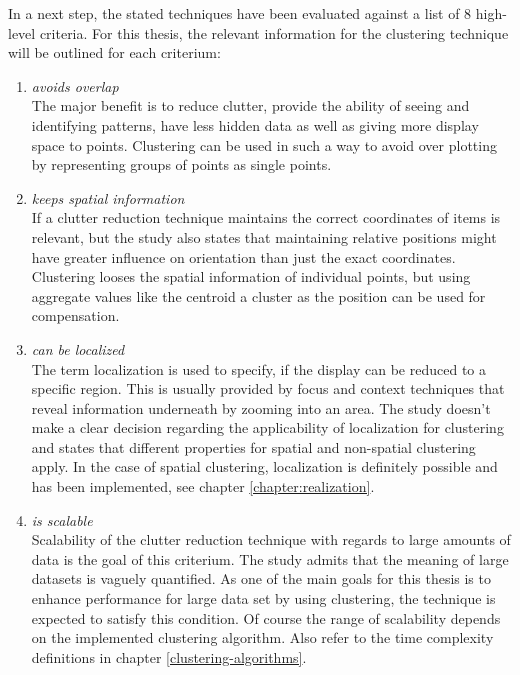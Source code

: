 In a next step, the stated techniques have been evaluated against a list of 8 high-level criteria. For this thesis, the relevant information for the clustering technique will be outlined for each criterium:

\begin{enumerate}

\item \textit{avoids overlap}
\\ The major benefit is to reduce clutter, provide the ability of seeing and identifying patterns, have less hidden data as well as giving more display space to points. Clustering can be used in such a way to avoid over plotting by representing groups of points as single points.

\item \textit{keeps spatial information}
\\ If a clutter reduction technique maintains the correct coordinates of items is relevant, but the study also states that maintaining relative positions might have greater influence on orientation than just the exact coordinates. Clustering looses the spatial information of individual points, but using aggregate values like the centroid a cluster as the position can be used for compensation. 

\item \textit{can be localized}
\\ The term localization is used to specify, if the display can be reduced to a specific region. This is usually provided by focus and context techniques that reveal information underneath by zooming into an area. The study doesn't make a clear decision regarding the applicability of localization for clustering and states that different properties for spatial and non-spatial clustering apply. In the case of spatial clustering, localization is definitely possible and has been implemented, see chapter \ref{chapter:realization}.  

\item \textit{is scalable}
\\ Scalability of the clutter reduction technique with regards to large amounts of data is the goal of this criterium. The study admits that the meaning of large datasets is vaguely quantified. As one of the main goals for this thesis is to enhance performance for large data set by using clustering, the technique is expected to satisfy this condition. Of course the range of scalability depends on the implemented clustering algorithm. Also refer to the time complexity definitions in chapter \ref{clustering-algorithms}. 


\end{enumerate}
